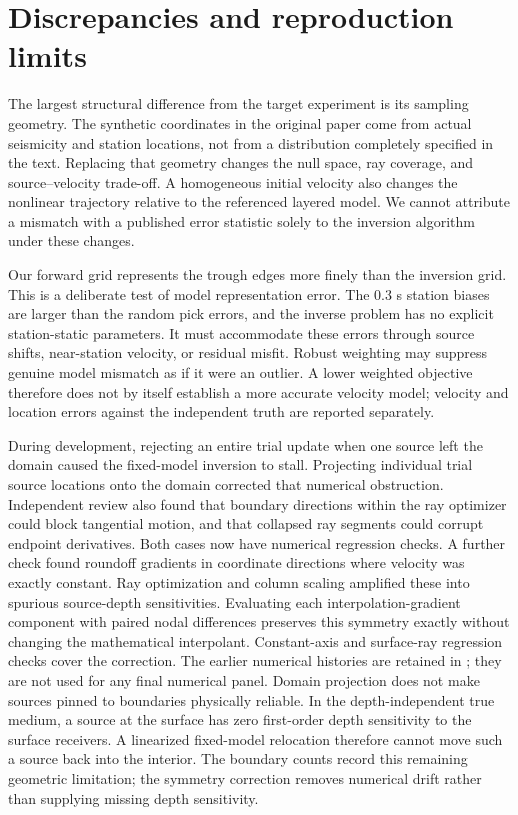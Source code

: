 \documentclass[11pt]{article}
\begin{document}
\section{Discrepancies and reproduction limits}
The largest structural difference from the target experiment is its sampling
geometry. The synthetic coordinates in the original paper come from actual
seismicity and station locations, not from a distribution completely specified
in the text. Replacing that geometry changes the null space, ray coverage,
and source--velocity trade-off. A homogeneous initial velocity also changes
the nonlinear trajectory relative to the referenced layered model. We cannot
attribute a mismatch with a published error statistic solely to the inversion
algorithm under these changes.

Our forward grid represents the trough edges more finely than the inversion
grid. This is a deliberate test of model representation error. The 0.3 s
station biases are larger than the random pick errors, and the inverse
problem has no explicit station-static parameters. It must accommodate
these errors through source shifts, near-station velocity, or residual misfit.
Robust weighting may suppress genuine model mismatch as if it were an
outlier. A lower weighted objective therefore does not by itself establish
a more accurate velocity model; velocity and location errors against the
independent truth are reported separately.

During development, rejecting an entire trial update when one source left
the domain caused the fixed-model inversion to stall. Projecting individual
trial source locations onto the domain corrected that numerical obstruction.
Independent review also found that boundary directions within the ray
optimizer could block tangential motion, and that collapsed ray segments
could corrupt endpoint derivatives. Both cases now have numerical regression
checks. A further check found roundoff gradients in coordinate directions
where velocity was exactly constant. Ray optimization and column scaling
amplified these into spurious source-depth sensitivities. Evaluating each
interpolation-gradient component with paired nodal differences preserves
this symmetry exactly without changing the mathematical interpolant.
Constant-axis and surface-ray regression checks cover the correction.
The earlier numerical histories are retained in ; they are
not used for any final numerical panel. Domain projection does not make
sources pinned to boundaries physically reliable.
In the depth-independent true medium, a source at the surface has zero
first-order depth sensitivity to the surface receivers. A linearized
fixed-model relocation therefore cannot move such a source back into the
interior. The boundary counts record this remaining geometric limitation;
the symmetry correction removes numerical drift rather than supplying
missing depth sensitivity.
\end{document}
